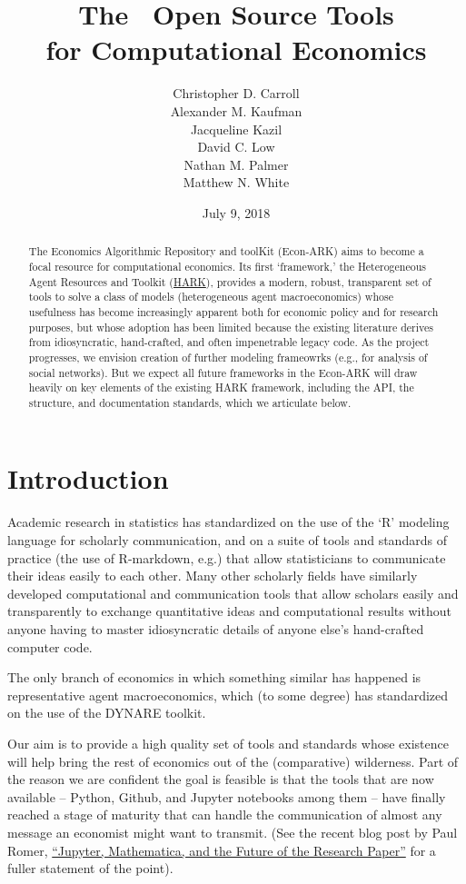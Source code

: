 \documentclass[10pt,twocolumn]{article}
\title{The \EconARK~Open Source Tools \\ for Computational Economics}
\author{Christopher D. Carroll \\ Alexander M. Kaufman \\ Jacqueline Kazil \\ David C. Low \\ Nathan M. Palmer \\ Matthew N. White}
\date{July 9, 2018}
\begin{document}
\maketitle
\begin{abstract}
  The Economics Algorithmic Repository and toolKit (Econ-ARK) aims to become a focal resource for computational economics. Its first `framework,' the Heterogeneous Agent Resources and Toolkit (\href{http://github.com/econ-ark/HARK}{HARK}), provides a modern, robust, transparent set of tools to solve a class of models (heterogeneous agent macroeconomics) whose usefulness has become increasingly apparent both for economic policy and for research purposes, but whose adoption has been limited because the existing literature derives from idiosyncratic, hand-crafted, and often impenetrable legacy code. As the project progresses, we envision creation of further modeling frameowrks (e.g., for analysis of social networks).  But we expect all future frameworks in the Econ-ARK will draw heavily on key elements of the existing HARK framework, including the API, the structure, and documentation standards, which we articulate below.
\end{abstract}


\section{Introduction}\label{introduction}

Academic research in statistics has standardized on the use of the `R' modeling language for scholarly
communication, and on a suite of tools and standards of practice (the use of R-markdown, e.g.) that allow statisticians to communicate their ideas easily to each other. Many other scholarly fields have similarly developed computational and communication tools that allow scholars easily and transparently to exchange quantitative ideas and computational results without anyone having to master idiosyncratic details of anyone else's hand-crafted computer code.

The only branch of economics in which something similar has happened is representative agent macroeconomics, which (to some degree) has standardized on the use of the DYNARE toolkit.

Our aim is to provide a high quality set of tools and standards whose existence will help bring the rest of economics out of the (comparative) wilderness. Part of the reason we are confident the goal is feasible is that the tools that are now available -- Python, Github, and Jupyter notebooks among them -- have finally reached a stage of maturity that can handle the communication of almost any message an economist might want to transmit.  (See the recent blog post by Paul Romer, \href{https://paulromer.net/jupyter-mathematica-and-the-future-of-the-research-paper/}{``Jupyter, Mathematica, and the Future of the Research Paper''} for a fuller statement of the point).
\end{document}
